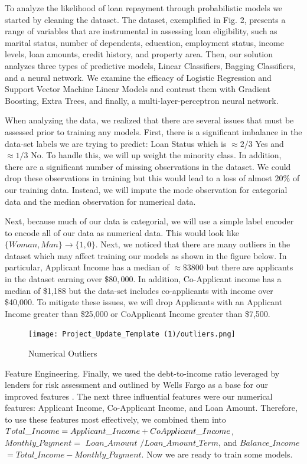 \documentclass[conference]{IEEEtran}
\begin{document}
To analyze the likelihood of loan repayment through probabilistic models we started by cleaning the dataset. The dataset, exemplified in Fig. 2, presents a range of variables that are instrumental in assessing loan eligibility, such as marital status, number of dependents, education, employment status, income levels, loan amounts, credit history, and property area. Then, our solution analyzes three types of predictive models, Linear Classifiers, Bagging Classifiers, and a neural network. We examine the efficacy of Logistic Regression and Support Vector Machine Linear Models and contrast them with Gradient Boosting, Extra Trees, and finally, a multi-layer-perceptron neural network.

When analyzing the data, we realized that there are several issues that must be assessed prior to training any models. First, there is a significant imbalance in the data-set labels we are trying to predict: Loan Status which is $\approx 2/3$ Yes and $\approx 1/3$ No. To handle this, we will up weight the minority class. In addition, there are a significant number of missing observations in the dataset. We could drop these observations in training but this would lead to a loss of almost $20 \%$ of our training data. Instead, we will impute the mode observation for categorial data and the median observation for numerical data.  

Next, because much of our data is categorial, we will use a simple label encoder to encode all of our data as numerical data. This would look like $\{Woman, Man\} \rightarrow \{1, 0\}$. Next, we noticed that there are many outliers in the dataset which may affect training our models as shown in the figure below. In particular, Applicant Income has a median of $\approx \$3800 $ but there are applicants in the dataset earning over $\$80,000$. In addition, Co-Applicant income has a median of \$1,188 but the data-set includes co-applicants with income over \$40,000. To mitigate these issues, we will drop Applicants with an Applicant Income greater than \$25,000 or CoApplicant Income greater than \$7,500. 

\begin{figure}[H]
  \centering
  \texttt{[image: Project\_Update\_Template (1)/outliers.png]}
  \caption{Numerical Outliers}
\end{figure}

Feature Engineering. Finally, we used the debt-to-income ratio leveraged by lenders for risk assessment and outlined by Wells Fargo as a base for our improved features \cite{item 12}. The next three influential features were our numerical features: Applicant Income, Co-Applicant Income, and Loan Amount. Therefore, to use these features most effectively, we combined them into $Total\_Income = Applicant\_Income + Co\-Applicant\_Income$, $Monthly\_Payment=$ $ Loan\_Amount$ $/ Loan\_Amount\_Term$, and $Balance\_Income$ $= Total\_Income - Monthly\_Payment$. Now we are ready to train some models.
\end{document}
